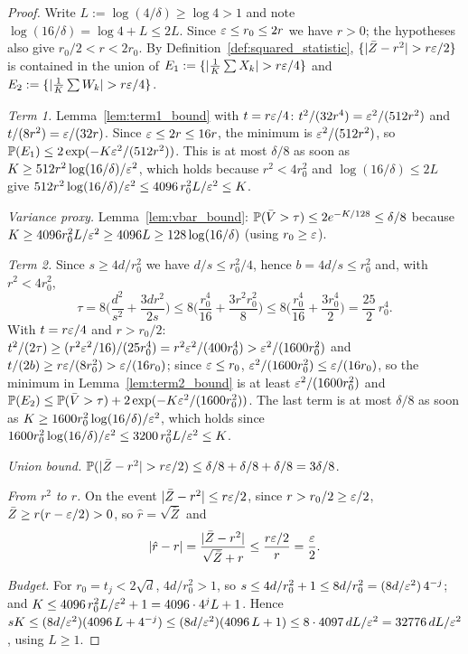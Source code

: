 \begin{proof}
\leanok
{}
Write $L := \log(4/\delta) \ge \log 4 > 1$ and note $\log(16/\delta) = \log 4 + L \le 2L$.
Since $\varepsilon \le r_0 \le 2r$ we have $r > 0$; the hypotheses also give $r_0/2 < r < 2r_0$. By
Definition~\ref{def:squared_statistic}, $\{|\bar Z - r^2| > r\varepsilon/2\}$ is contained in the
union of $E_1 := \{|\frac1K\sum X_k| > r\varepsilon/4\}$ and $E_2 := \{|\frac1K\sum W_k| > r\varepsilon/4\}$.

\emph{Term 1.} Lemma~\ref{lem:term1_bound} with $t = r\varepsilon/4$: $t^2/(32r^4) = \varepsilon^2/(512r^2)$
and $t/(8r^2) = \varepsilon/(32r)$. Since $\varepsilon \le 2r \le 16r$, the minimum is $\varepsilon^2/(512r^2)$,
so $\mathbb{P}(E_1) \le 2\exp(-K\varepsilon^2/(512r^2))$. This is at most $\delta/8$ as soon as
$K \ge 512r^2\log(16/\delta)/\varepsilon^2$, which holds because $r^2 < 4r_0^2$ and
$\log(16/\delta) \le 2L$ give $512r^2\log(16/\delta)/\varepsilon^2 \le 4096\,r_0^2L/\varepsilon^2 \le K$.

\emph{Variance proxy.} Lemma~\ref{lem:vbar_bound}: $\mathbb{P}(\bar V > \tau) \le 2e^{-K/128} \le \delta/8$
because $K \ge 4096 r_0^2L/\varepsilon^2 \ge 4096 L \ge 128\log(16/\delta)$ (using $r_0 \ge \varepsilon$).

\emph{Term 2.} Since $s \ge 4d/r_0^2$ we have $d/s \le r_0^2/4$, hence $b = 4d/s \le r_0^2$ and,
with $r^2 < 4r_0^2$,
\[
  \tau = 8\Big( \frac{d^2}{s^2} + \frac{3dr^2}{2s} \Big)
  \le 8\Big( \frac{r_0^4}{16} + \frac{3 r^2 r_0^2}{8} \Big)
  \le 8\Big( \frac{r_0^4}{16} + \frac{3 r_0^4}{2} \Big) = \frac{25}{2}\,r_0^4 .
\]
With $t = r\varepsilon/4$ and $r > r_0/2$:
$t^2/(2\tau) \ge (r^2\varepsilon^2/16)/(25r_0^4) = r^2\varepsilon^2/(400r_0^4) > \varepsilon^2/(1600 r_0^2)$ and
$t/(2b) \ge r\varepsilon/(8r_0^2) > \varepsilon/(16r_0)$; since $\varepsilon \le r_0$,
$\varepsilon^2/(1600r_0^2) \le \varepsilon/(16r_0)$, so the minimum in Lemma~\ref{lem:term2_bound} is at
least $\varepsilon^2/(1600r_0^2)$ and
$\mathbb{P}(E_2) \le \mathbb{P}(\bar V > \tau) + 2\exp(-K\varepsilon^2/(1600r_0^2))$. The last term is at
most $\delta/8$ as soon as $K \ge 1600r_0^2\log(16/\delta)/\varepsilon^2$, which holds since
$1600r_0^2\log(16/\delta)/\varepsilon^2 \le 3200\,r_0^2L/\varepsilon^2 \le K$.

\emph{Union bound.} $\mathbb{P}(|\bar Z - r^2| > r\varepsilon/2) \le \delta/8 + \delta/8 + \delta/8 = 3\delta/8$.

\emph{From $r^2$ to $r$.} On the event $|\bar Z - r^2| \le r\varepsilon/2$, since $r > r_0/2 \ge \varepsilon/2$,
$\bar Z \ge r(r - \varepsilon/2) > 0$, so $\hat r = \sqrt{\bar Z}$ and
\[
  \lvert \hat r - r \rvert = \frac{\lvert \bar Z - r^2 \rvert}{\sqrt{\bar Z} + r} \le \frac{r\varepsilon/2}{r} = \frac{\varepsilon}{2}.
\]

\emph{Budget.} For $r_0 = t_j < 2\sqrt d$, $4d/r_0^2 > 1$, so
$s \le 4d/r_0^2 + 1 \le 8d/r_0^2 = (8d/\varepsilon^2)\,4^{-j}$; and
$K \le 4096\,r_0^2L/\varepsilon^2 + 1 = 4096\cdot 4^j L + 1$. Hence
$sK \le (8d/\varepsilon^2)(4096\,L + 4^{-j}) \le (8d/\varepsilon^2)(4096\,L + 1) \le 8\cdot 4097\, dL/\varepsilon^2
= 32776\, dL/\varepsilon^2$, using $L \ge 1$.
\end{proof}

